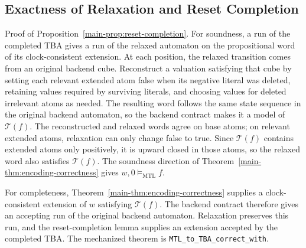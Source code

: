 \documentclass[10pt,journal,compsoc]{IEEEtran}
\newcommand{\satM}{\models_{\mathrm{MTL}}}
\newcommand{\T}{\mathcal{T}}
\begin{document}
\subsection{Exactness of Relaxation and Reset Completion}
\label{subsec:relaxation-exactness}
Proof of Proposition~\ref{main-prop:reset-completion}. For soundness, a run of the
completed TBA gives a run of the relaxed automaton on the propositional word
of its clock-consistent extension. At each position, the relaxed transition
comes from an original backend cube. Reconstruct a valuation satisfying that
cube by setting each relevant extended atom false when its negative literal
was deleted, retaining values required by surviving literals, and choosing
values for deleted irrelevant atoms as needed. The resulting word follows the
same state sequence in the original backend automaton, so the backend contract
makes it a model of $\T(f)$. The reconstructed and relaxed words agree on base
atoms; on relevant extended atoms, relaxation can only change false to true.
Since $\T(f)$ contains extended atoms only positively, it is upward closed in
those atoms, so the relaxed word also satisfies $\T(f)$. The soundness
direction of Theorem~\ref{main-thm:encoding-correctness} gives
$w,0\satM f$.

For completeness, Theorem~\ref{main-thm:encoding-correctness} supplies a
clock-consistent extension of $w$ satisfying $\T(f)$. The backend contract
therefore gives an accepting run of the original backend automaton.
Relaxation preserves this run, and the reset-completion lemma supplies an
extension accepted by the completed TBA. The mechanized theorem is
\texttt{MTL\_to\_TBA\_correct\_with}.


\end{document}
